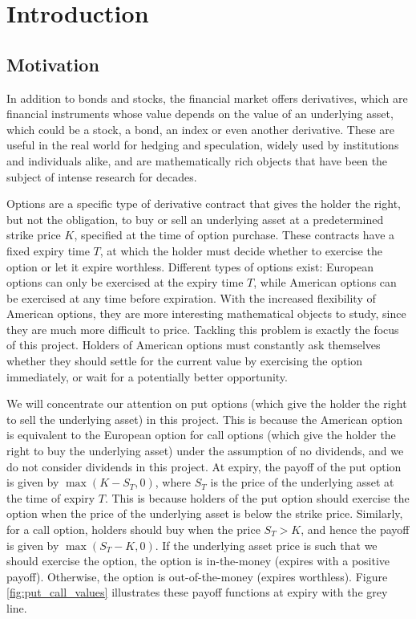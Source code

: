 \chapter{Introduction}

\section{Motivation}

In addition to bonds and stocks, the financial market offers derivatives, which are financial instruments whose value depends on the value of an underlying asset, which could be a stock, a bond, an index or even another derivative. These are useful in the real world for hedging and speculation, widely used by institutions and individuals alike, and are mathematically rich objects that have been the subject of intense research for decades.

Options are a specific type of derivative contract that gives the holder the right, but not the obligation, to buy or sell an underlying asset at a predetermined strike price $K$, specified at the time of option purchase. These contracts have a fixed expiry time $T$, at which the holder must decide whether to exercise the option or let it expire worthless. Different types of options exist: European options can only be exercised at the expiry time $T$, while American options can be exercised at any time before expiration. With the increased flexibility of American options, they are more interesting mathematical objects to study, since they are much more difficult to price. Tackling this problem is exactly the focus of this project. Holders of American options must constantly ask themselves whether they should settle for the current value by exercising the option immediately, or wait for a potentially better opportunity.

We will concentrate our attention on put options (which give the holder the right to sell the underlying asset) in this project. This is because the American option is equivalent to the European option for call options (which give the holder the right to buy the underlying asset) under the assumption of no dividends, and we do not consider dividends in this project. At expiry, the payoff of the put option is given by $\max(K - S_T, 0)$, where $S_T$ is the price of the underlying asset at the time of expiry $T$. This is because holders of the put option should exercise the option when the price of the underlying asset is below the strike price. Similarly, for a call option, holders should buy when the price $S_T > K$, and hence the payoff is given by $\max(S_T - K, 0)$. If the underlying asset price is such that we should exercise the option, the option is in-the-money (expires with a positive payoff). Otherwise, the option is out-of-the-money (expires worthless). Figure \ref{fig:put_call_values} illustrates these payoff functions at expiry with the grey line.

